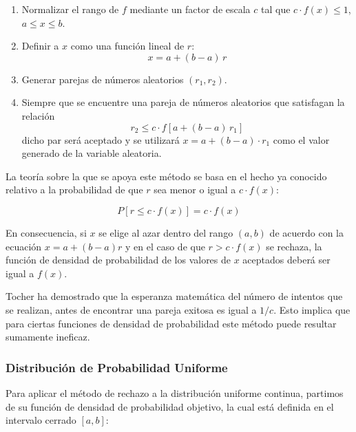 \documentclass{article}
\begin{document}
\begin{enumerate}
    \item Normalizar el rango de $f$ mediante un factor de escala $c$ tal que
          $c \cdot f(x) \leq 1$, $a \leq x \leq b$.
    \item Definir a $x$ como una función lineal de $r$:
          \begin{equation}
              x = a + (b - a)\,r
          \end{equation}
    \item Generar parejas de números aleatorios $(r_1, r_2)$.
    \item Siempre que se encuentre una pareja de números aleatorios que satisfagan la
          relación
          \begin{equation}
              r_2 \leq c \cdot f\!\left[a + (b-a)\,r_1\right]
          \end{equation}
          dicho par será aceptado y se utilizará $x = a + (b-a)\cdot r_1$ como el valor
          generado de la variable aleatoria.
\end{enumerate}

La teoría sobre la que se apoya este método se basa en el hecho ya conocido relativo a la
probabilidad de que $r$ sea menor o igual a $c \cdot f(x)$:

\begin{equation}
    P\!\left[r \leq c \cdot f(x)\right] = c \cdot f(x)
\end{equation}

En consecuencia, si $x$ se elige al azar dentro del rango $(a, b)$ de acuerdo con la ecuación
$x = a + (b-a)r$ y en el caso de que $r > c \cdot f(x)$ se rechaza, la función de densidad
de probabilidad de los valores de $x$ aceptados deberá ser igual a $f(x)$.

Tocher ha demostrado que la esperanza matemática del número de intentos que se
realizan, antes de encontrar una pareja exitosa es igual a $1/c$. Esto implica que para
ciertas funciones de densidad de probabilidad este método puede resultar sumamente
ineficaz.


\subsubsection{Distribución de Probabilidad Uniforme}

Para aplicar el método de rechazo a la distribución uniforme continua, partimos de su
función de densidad de probabilidad objetivo, la cual está definida en el intervalo cerrado
$[a, b]$:
\end{document}
